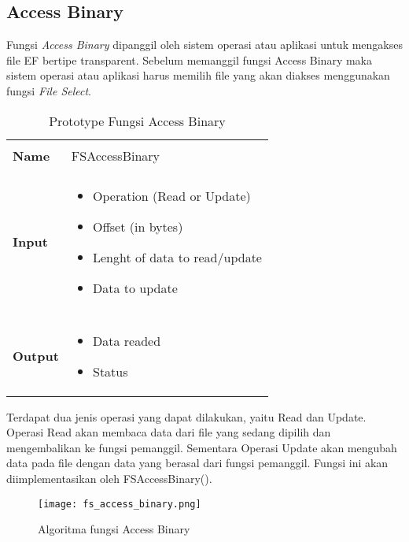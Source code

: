 \documentclass[a4paper, 12pt]{report}
\begin{document}
\subsection{Access Binary}

Fungsi {\em Access Binary} dipanggil oleh sistem operasi atau aplikasi untuk mengakses file EF bertipe transparent. Sebelum memanggil fungsi Access Binary maka sistem operasi atau aplikasi harus memilih file yang akan diakses menggunakan fungsi {\em File Select}. 

\begin{table}[hp]
  \centering
  \begin{tabular}{p{2cm} p{8cm}}
    \hline\\
    {\bf Name} & FSAccessBinary\\
    \hline\\
    {\bf Input} & 
    \begin{itemize}[noitemsep,topsep=0pt,parsep=0pt,partopsep=0pt]
    \item Operation (Read or Update)
    \item Offset (in bytes)
    \item Lenght of data to read/update
    \item Data to update
    \end{itemize}
    \\
    \hline\\
    {\bf Output} & 
    \begin{itemize}[noitemsep,topsep=0pt,parsep=0pt,partopsep=0pt]
    \item Data readed
    \item Status
    \end{itemize}
    \\
    \hline
  \end{tabular}
  \caption{Prototype Fungsi Access Binary}
  \label{tbl-access-binary}
\end{table}

Terdapat dua jenis operasi yang dapat dilakukan, yaitu Read dan Update. Operasi Read akan membaca data dari file yang sedang dipilih dan mengembalikan ke fungsi pemanggil. Sementara Operasi Update akan mengubah data pada file dengan data yang berasal dari fungsi pemanggil. Fungsi ini akan diimplementasikan oleh FSAccessBinary().

\begin{figure}
\centering
\texttt{[image: fs\_access\_binary.png]}
\caption{Algoritma fungsi Access Binary}
\label{fig-access-binary}
\end{figure}
\end{document}
